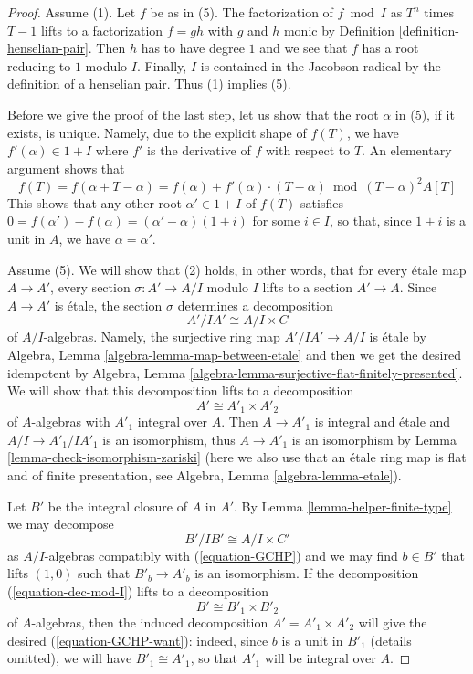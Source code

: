 \begin{proof}
\medskip\noindent
Assume (1). Let $f$ be as in (5). The factorization of $f \bmod I$
as $T^n$ times $T - 1$ lifts to a factorization $f = gh$ with $g$
and $h$ monic by Definition \ref{definition-henselian-pair}.
Then $h$ has to have degree $1$
and we see that $f$ has a root reducing to $1$ modulo $I$.
Finally, $I$ is contained in the Jacobson radical by
the definition of a henselian pair.
Thus (1) implies (5).

\medskip\noindent
Before we give the proof of the last step, let us show that
the root $\alpha$ in (5), if it exists, is unique. Namely,
due to the explicit shape of $f(T)$, we have
$f'(\alpha) \in 1 + I$ where $f'$ is the derivative of $f$ with
respect to $T$. An elementary argument shows that
$$
f(T) = f(\alpha + T - \alpha) =
f(\alpha) + f'(\alpha) \cdot (T - \alpha) \bmod
(T - \alpha)^2 A[T]
$$
This shows that any other root $\alpha' \in 1 + I$ of $f(T)$
satisfies $0 = f(\alpha') - f(\alpha) = (\alpha' - \alpha)(1 + i)$
for some $i \in I$, so that, since $1 + i$ is a unit in $A$,
we have $\alpha = \alpha'$.

\medskip\noindent
Assume (5). We will show that (2) holds, in other words, that
for every \'etale map $A \to A'$, every section $\sigma : A' \to A/I$
modulo $I$ lifts to a section $A' \to A$.
Since $A \to A'$ is \'etale, the section $\sigma$
determines a decomposition
\begin{equation}
\label{equation-GCHP}
A'/IA' \cong A/I \times C
\end{equation}
of $A/I$-algebras. Namely, the surjective ring map
$A'/IA' \to A/I$ is \'etale by
Algebra, Lemma \ref{algebra-lemma-map-between-etale}
and then we get the desired idempotent by
Algebra, Lemma \ref{algebra-lemma-surjective-flat-finitely-presented}.
We will show that this decomposition lifts to a decomposition 
\begin{equation}
\label{equation-GCHP-want}
A' \cong A'_1 \times A'_2
\end{equation}
of $A$-algebras with $A'_1$ integral over $A$. Then $A \to A'_1$
is integral and \'etale and $A/I \to A'_1/IA'_1$ is an isomorphism,
thus $A \to A'_1$ is an isomorphism by
Lemma \ref{lemma-check-isomorphism-zariski}
(here we also use that an \'etale ring map is flat
and of finite presentation, see Algebra, Lemma \ref{algebra-lemma-etale}).

\medskip\noindent
Let $B'$ be the integral closure of $A$ in $A'$. By
Lemma \ref{lemma-helper-finite-type}
we may decompose 
\begin{equation}
\label{equation-dec-mod-I}
B'/IB' \cong A/I \times C'
\end{equation}
as $A/I$-algebras compatibly with (\ref{equation-GCHP})
and we may find $b \in B'$ that lifts $(1, 0)$ such that
$B'_b \to A'_b$ is an isomorphism. If the decomposition
(\ref{equation-dec-mod-I}) lifts to a decomposition
\begin{equation}
\label{equation-want-2}
B' \cong B'_1 \times B'_2
\end{equation}
of $A$-algebras, then the induced decomposition
$A' = A'_1 \times A'_2$ will give the
desired (\ref{equation-GCHP-want}): indeed, since $b$ is a unit in $B'_1$
(details omitted),
we will have $B'_1 \cong A'_1$, so that $A'_1$ will be integral over $A$. 


\end{proof}
